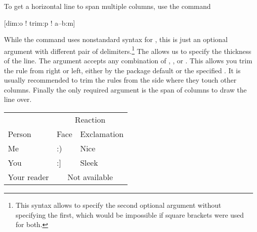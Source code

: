 To get a horizontal line to span multiple columns, use the command
\begin{lscommand}
  [dim:o ! trim:p ! a--b:m]
\end{lscommand}
While the command uses nonstandard syntax for , this is just an
optional argument with different pair of delimiters.\footnote{This syntax
  allows to specify the second optional argument without specifying the first,
  which would be impossible if square brackets were used for both.} The
 allows us to specify the thickness of the line. The 
argument accepts any combination of , ,
 or . This allows you trim the rule from right
or left, either by the package default or the specified . It is
usually recommended to trim the rules from the side where they touch other
columns. Finally the only required argument  is the span of columns
to draw the line over.
\begin{chktexignore}
  \begin{example}[examplewidth=0.43\linewidth]
\begin{tabular}{@{}lll@{}}
  \toprule
              & \multicolumn{2}{c}{
                  Reaction}        \\
  \cmidrule(l){2-3}
  Person      & Face & Exclamation \\
  \midrule
  Me          & :)   & Nice        \\
  You         & :]   & Sleek       \\
  Your reader & \multicolumn{2}{c}{
                  Not available}   \\
  \bottomrule
\end{tabular}
\end{example}
\end{chktexignore}

